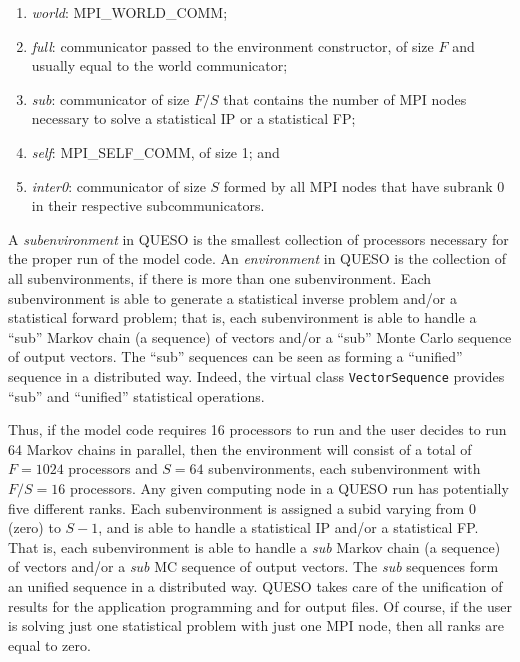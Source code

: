 \begin{enumerate}

\item {\it world}: MPI\_WORLD\_COMM;
\item {\it full}: communicator passed to the environment constructor, of size $F$ and usually equal to the world communicator;
\item {\it sub}: communicator of size $F/S$ that contains the number of MPI nodes necessary to solve a statistical IP or a statistical FP;
\item {\it self}: MPI\_SELF\_COMM, of size 1; and
\item {\it inter0}: communicator of size $S$ formed by all MPI nodes that have subrank 0 in their respective subcommunicators.
 
\end{enumerate}


A {\it subenvironment} in QUESO is the smallest collection of processors necessary for the proper run of the model code.
An {\it environment} in QUESO is the collection of all subenvironments, if there is more than one subenvironment. %
    Each subenvironment is able to generate a statistical inverse problem and/or a statistical forward problem; that is, each subenvironment is able to handle a ``sub'' Markov chain (a sequence) of vectors and/or a ``sub'' Monte Carlo sequence of output vectors.
    The ``sub'' sequences can be seen as forming a ``unified'' sequence in a distributed way.
    Indeed, the virtual class \verb+VectorSequence+ provides ``sub'' and ``unified'' statistical operations. 

Thus, if the model code requires 16 processors to run and the user decides to run 64 Markov chains in parallel,
then the environment will consist of a total of $F=1024$ processors and $S=64$ subenvironments, each subenvironment with $F/S=16$ processors.
Any given computing node in a QUESO run has potentially five different ranks.
Each subenvironment is assigned a subid varying from $0$ (zero) to $S-1$, and is able to handle a statistical IP and/or a statistical FP.
That is, each subenvironment is able to handle a {\it sub} Markov chain (a sequence) of vectors and/or a {\it sub} MC sequence of output vectors.
The {\it sub} sequences form an unified sequence in a distributed way.
QUESO takes care of the unification of results for the application programming and for output files.  Of course, if the user is solving just one statistical problem with just one MPI node, then all ranks are equal to zero.

